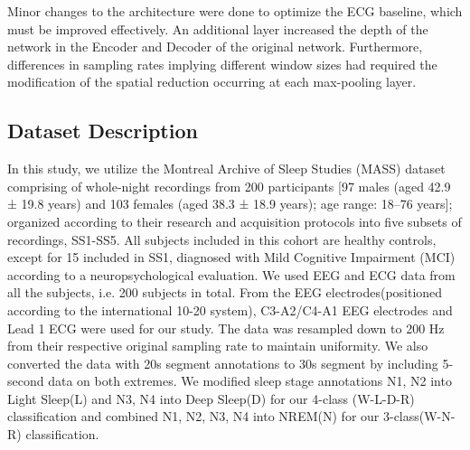 \documentclass[letterpaper, 10 pt, conference]{ieeeconf}
\begin{document}
Minor changes to the architecture were done to optimize the ECG baseline, which must be improved effectively. An additional layer increased the depth of the network in the Encoder and Decoder of the original network. Furthermore, differences in sampling rates implying different window sizes had required the modification of the spatial reduction occurring at each max-pooling layer. 

\subsection{Dataset Description}

In this study, we utilize the Montreal Archive of Sleep Studies (MASS) \cite{o2014montreal} dataset comprising of whole‐night recordings from 200 participants [97 males (aged 42.9 ± 19.8 years) and 103 females (aged 38.3 ± 18.9 years); age range: 18–76 years]; organized according to their research and acquisition protocols into five subsets of recordings, SS1-SS5. All subjects included in this cohort are healthy controls, except for 15 included in SS1, diagnosed with Mild Cognitive Impairment (MCI) according to a neuropsychological evaluation. We used EEG and ECG data from all the subjects, i.e. 200 subjects in total. From the EEG electrodes(positioned according to the international 10-20 system), C3-A2/C4-A1 EEG electrodes and Lead 1 ECG were used for our study. The data was resampled down to 200 Hz from their respective original sampling rate to maintain uniformity. We also converted the data with 20s segment annotations to 30s segment by including 5-second data on both extremes. We modified sleep stage annotations N1, N2 into Light Sleep(L) and N3, N4 into Deep Sleep(D) for our 4-class (W-L-D-R) classification and combined N1, N2, N3, N4 into NREM(N) for our 3-class(W-N-R) classification.
 
\end{document}
